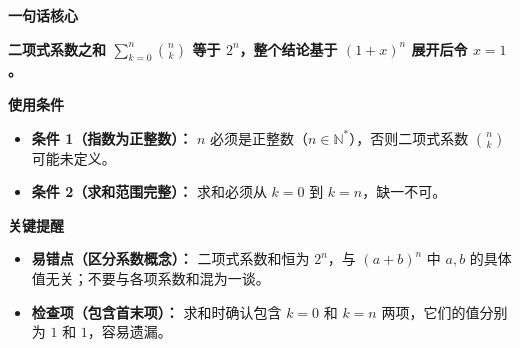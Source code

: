 \begin{summarybox}
	\textbf{\textcolor{CSummary}{一句话核心}}

	\textbf{二项式系数之和 $\sum_{k=0}^{n} \binom{n}{k}$ 等于 $2^n$，整个结论基于 $(1+x)^n$ 展开后令 $x=1$。}

	\medskip
	\textbf{\textcolor{CSummary}{使用条件}}
	\begin{itemize}[leftmargin=*, itemsep=0.5em, topsep=0.4em]
		\item \textbf{条件 1（指数为正整数）：} $n$ 必须是正整数（$n\in\mathbb{N}^*$），否则二项式系数 $\binom{n}{k}$ 可能未定义。
		\item \textbf{条件 2（求和范围完整）：} 求和必须从 $k=0$ 到 $k=n$，缺一不可。
	\end{itemize}

	\medskip
	\textbf{\textcolor{CSummary}{关键提醒}}
	\begin{itemize}[leftmargin=*, itemsep=0.5em, topsep=0.4em]
		\item \textbf{易错点（区分系数概念）：} 二项式系数和恒为 $2^n$，与 $(a+b)^n$ 中 $a,b$ 的具体值无关；不要与各项系数和混为一谈。
		\item \textbf{检查项（包含首末项）：} 求和时确认包含 $k=0$ 和 $k=n$ 两项，它们的值分别为 $1$ 和 $1$，容易遗漏。
	\end{itemize}
\end{summarybox}
